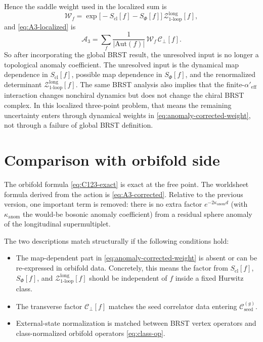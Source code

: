 \documentclass[11pt]{article}
\newcommand{\mc}[1]{\mathcal{#1}}
\newcommand{\Aeff}{\alpha'_{\mathrm{eff}}}
\begin{document}
Hence the saddle weight used in the localized sum is
\begin{equation}\label{eq:anomaly-corrected-weight}
\mc W_f
=
\exp\!\Big[-S_{\mathrm{cl}}[f]-S_\Phi[f]\Big]\,
\mc Z^{\mathrm{long}}_{1\text{-}\mathrm{loop}}[f],
\end{equation}
and \eqref{eq:A3-localized} is
\begin{equation}\label{eq:A3-corrected}
\mc A_3
=
\sum_{f}\frac{1}{|\mathrm{Aut}(f)|}\,\mc W_f\,\mc C_\perp[f].
\end{equation}
So after incorporating the global BRST result, the unresolved input is no longer a topological anomaly coefficient. The unresolved input is the dynamical map dependence in $S_{\mathrm{cl}}[f]$, possible map dependence in $S_\Phi[f]$, and the renormalized determinant $\mc Z^{\mathrm{long}}_{1\text{-}\mathrm{loop}}[f]$.
The same BRST analysis also implies that the finite-$\Aeff$ interaction changes nonchiral dynamics but does not change the chiral BRST complex. In this localized three-point problem, that means the remaining uncertainty enters through dynamical weights in \eqref{eq:anomaly-corrected-weight}, not through a failure of global BRST definition.

\section{Comparison with orbifold side}
The orbifold formula \eqref{eq:C123-exact} is exact at the free point.
The worldsheet formula derived from the action is \eqref{eq:A3-corrected}.
Relative to the previous version, one important term is removed: there is no extra factor $e^{-2\kappa_{\mathrm{anom}}d}$ (with $\kappa_{\mathrm{anom}}$ the would-be bosonic anomaly coefficient) from a residual sphere anomaly of the longitudinal supermultiplet.

The two descriptions match structurally if the following conditions hold:
\begin{itemize}
\item The map-dependent part in \eqref{eq:anomaly-corrected-weight} is absent or can be re-expressed in orbifold data. Concretely, this means the factor from $S_{\mathrm{cl}}[f]$, $S_\Phi[f]$, and $\mc Z^{\mathrm{long}}_{1\text{-}\mathrm{loop}}[f]$ should be independent of $f$ inside a fixed Hurwitz class.
\item The transverse factor $\mc C_\perp[f]$ matches the seed correlator data entering $\mc C_{\mathrm{seed}}^{(g)}$.
\item External-state normalization is matched between BRST vertex operators and class-normalized orbifold operators \eqref{eq:class-op}.
\end{itemize}
\end{document}
